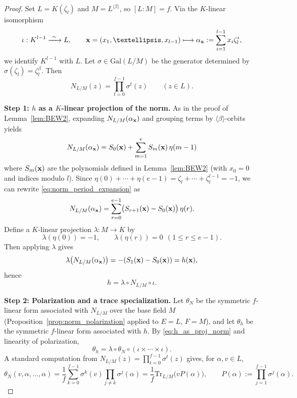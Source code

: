 \documentclass[10pt,a4paper]{amsart}
\newcommand{\Gal}{\mathrm{Gal}}
\newcommand{\Tr}{\mathrm{Tr}}
\begin{document}
\begin{proof}
Set $L=K(\zeta_l)$ and $M=L^{\langle\beta\rangle}$, so $[L:M]=f$.
Via the $K$-linear isomorphism
\[
\iota:K^{l-1}\xrightarrow{\ \sim\ }L,\qquad
{\bf x}=(x_1,\dots,x_{l-1})\longmapsto
\alpha_{\bf x}:=\sum_{i=1}^{l-1}x_i\zeta_l^i,
\]
we identify $K^{l-1}$ with $L$. Let $\sigma\in\Gal(L/M)$ be the generator determined by
$\sigma(\zeta_l)=\zeta_l^\beta$. Then
\[
N_{L/M}(z)=\prod_{t=0}^{f-1}\sigma^t(z)\qquad(z\in L).
\]

\medskip\noindent
\textbf{Step 1: $h$ as a $K$-linear projection of the norm.}
As in the proof of Lemma~\ref{lem:BEW2}, expanding $N_{L/M}(\alpha_{\bf x})$ and grouping terms by
$\langle\beta\rangle$-orbits yields
\begin{equation}\label{eq:norm_period_expansion}
N_{L/M}(\alpha_{\bf x})
= S_0({\bf x})+\sum_{m=1}^{e}S_m({\bf x})\,\eta(m-1)
\end{equation}
where $S_m({\bf x})$ are the polynomials defined in Lemma~\ref{lem:BEW2} (with $x_0=0$ and indices modulo $l$).
Since $\eta(0)+\cdots+\eta(e-1)=\zeta_l+\cdots+\zeta_l^{l-1}=-1$, we can rewrite \eqref{eq:norm_period_expansion} as
\[
N_{L/M}(\alpha_{\bf x})
=\sum_{r=0}^{e-1}\bigl(S_{r+1}({\bf x})-S_0({\bf x})\bigr)\,\eta(r).
\]
Define a $K$-linear projection $\lambda:M\to K$ by
\[
\lambda(\eta(0))=-1,\qquad \lambda(\eta(r))=0\ \ (1\le r\le e-1).
\]
Then applying $\lambda$ gives
\[
\lambda\bigl(N_{L/M}(\alpha_{\bf x})\bigr)=-(S_1({\bf x})-S_0({\bf x}))=h({\bf x}),
\]
hence
\begin{equation}\label{eq:h_as_proj_norm}
h=\lambda\circ N_{L/M}\circ\iota.
\end{equation}

\medskip\noindent
\textbf{Step 2: Polarization and a trace specialization.}
Let $\theta_N$ be the symmetric $f$-linear form associated with $N_{L/M}$ over the base field $M$
(Proposition~\ref{prop:norm_polarization} applied to $E=L$, $F=M$), and let $\theta_h$ be the symmetric
$f$-linear form associated with $h$.
By \eqref{eq:h_as_proj_norm} and linearity of polarization,
\begin{equation}\label{eq:theta_h_comp}
\theta_h=\lambda\circ\theta_N\circ(\iota\times\cdots\times\iota).
\end{equation}
A standard computation from $N_{L/M}(z)=\prod_{t=0}^{f-1}\sigma^t(z)$ gives, for $\alpha,v\in L$,
\begin{equation}\label{eq:thetaN_trace}
\theta_N(v,\alpha,\dots,\alpha)
=\frac{1}{f}\sum_{k=0}^{f-1}\sigma^k(v)\prod_{j\ne k}\sigma^j(\alpha)
=\frac{1}{f}\Tr_{L/M}\!\bigl(vP(\alpha)\bigr),
\qquad
P(\alpha):=\prod_{j=1}^{f-1}\sigma^j(\alpha).
\end{equation}


\end{proof}
\end{document}
